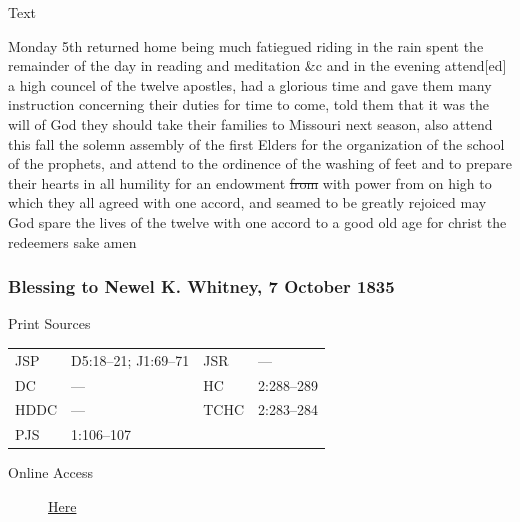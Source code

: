 			\begin{description}
				\item[Text]
			\end{description}
			
				Monday 5th returned home being much fatiegued riding in the rain spent the remainder of the day in reading and meditation \&c and in the evening attend[ed] a high councel of the twelve apostles, had a glorious time and gave them many instruction concerning their duties for time to come, told them that it was the will of God they should take their families to Missouri next season, also attend this fall the solemn assembly of the first Elders for the organization of the school of the prophets, and attend to the ordinence of the washing of feet and to prepare their hearts in all humility for an endowment \sout{from} with power from on high to which they all agreed with one accord, and seamed to be greatly rejoiced may God spare the lives of the twelve with one accord to a good old age for christ the redeemers sake amen
				
		\subsubsection{Blessing to Newel K. Whitney, 7 October 1835}
			\label{EMS-1835-JS-7-OCT-1835}
			
			\begin{description}
				\item[Print Sources]
			\end{description}

				\begin{tabular}{p{0.5in}p{1in}p{0.5in}p{1in}}
				JSP	 	& D5:18--21; J1:69--71		& JSR 		& --- \\
				DC	 	& --- 			& HC 		& 2:288--289 \\
				HDDC 	& ---			& TCHC 		& 2:283--284 \\
				PJS 	& 1:106--107			& 	 		&  \\
				\end{tabular}
			
			\begin{description}
				\item[Online Access] \href{https://www.josephsmithpapers.org/paper-summary/blessing-to-newel-k-whitney-7-october-1835/1}{Here}
			\end{description}
			
